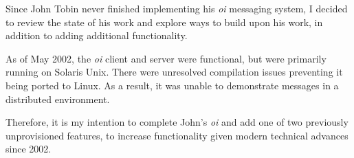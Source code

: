 
Since John Tobin never finished implementing his \emph{oi} messaging
system, I decided to review the state of his work and explore ways to
build upon his work, in addition to adding additional functionality.


As of May 2002, the \emph{oi} client and server were functional, but
were primarily running on Solaris Unix. There were unresolved
compilation issues preventing it being ported to Linux. As a result, it
was unable to demonstrate messages in a distributed environment.


Therefore, it is my intention to complete John's \emph{oi} and add one
of two previously unprovisioned features, to increase functionality
given modern technical advances since 2002.
